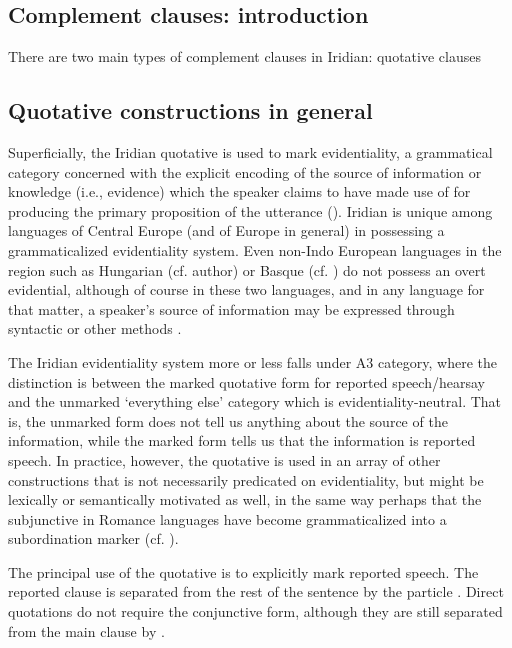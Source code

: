 \subsection{Complement clauses: introduction}\label{sec:complement-clauses}

There are two main types of complement clauses in Iridian: quotative clauses 

\subsection{Quotative constructions in general}\label{sec:reportedspeech}

Superficially, the Iridian quotative is used to mark {\sc evidentiality}, a
grammatical category concerned with the explicit encoding of the source of
information or knowledge (i.e., evidence) which the speaker claims to have made
use of for producing the primary proposition of the utterance
(\cite[1-2]{diewald2010}). Iridian is unique among languages of Central Europe
(and of Europe in general) in possessing a grammaticalized evidentiality system.
Even non-Indo European languages in the region such as Hungarian (cf. author) or
Basque (cf. \cite{alcazar2010}) do not possess an overt evidential, although of
course in these two languages, and in any language for that matter, a speaker's
source of information may be expressed through syntactic or other methods .

The Iridian evidentiality system more or less falls under
 A3 category, where the distinction is between the
marked quotative form for reported speech/hearsay and the unmarked `everything
else' category which is evidentiality-neutral. That is, the unmarked form does
not tell us anything about the source of the information, while the marked form
tells us that the information is reported speech. In practice, however, the
quotative is used in an array of other constructions that is not necessarily
predicated on evidentiality, but might be lexically or semantically motivated as
well, in the same way perhaps that the subjunctive in Romance languages have
become grammaticalized into a subordination marker (cf. \cite{poplacketal}).

The principal use of the quotative is to explicitly mark reported speech. The
reported clause is separated from the rest of the sentence by the particle
. Direct quotations do not require the conjunctive form, although they are
still separated from the main clause by .


